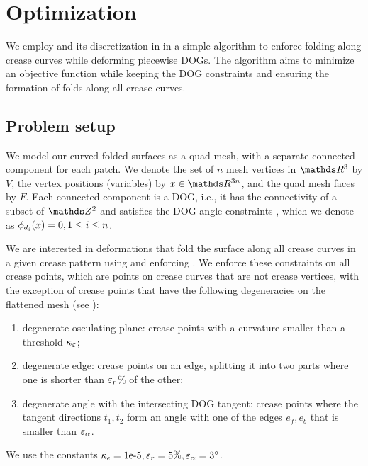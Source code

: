 
\section{Optimization} \label{sec:implementation}
We employ  and its discretization in  in a simple algorithm to enforce folding along crease curves while deforming piecewise DOGs. The algorithm aims to minimize an objective function while keeping the DOG constraints and ensuring the formation of folds along all crease curves.

\subsection{Problem setup}
We model our curved folded surfaces as a quad mesh, with a separate connected component for each patch. We denote the set of $n$ mesh vertices in $\R^3$ by $V$, the vertex positions (variables) by $\x \in \R^{3n}$, and the quad mesh faces by $F$. Each connected component is a DOG, i.e., it has the connectivity of a subset of $\Z^2$ and satisfies the DOG angle constraints \cite{rabi18}, which we denote as $\phi_{d_i}(x) = 0, 1 \leq i \leq n$.

We are interested in deformations that fold the surface along all crease curves in a given crease pattern using  and enforcing . We enforce these constraints on all crease points, which are points on crease curves that are not crease vertices, with the exception of crease points that have the following degeneracies on the flattened mesh (see ):
\begin{enumerate}
	\item degenerate osculating plane: crease points with a curvature smaller than a threshold $\kappa_\varepsilon$; \label{item:deg_osc}
	\item degenerate edge: crease points on an edge, splitting it into two parts where one is shorter than $\varepsilon_{r}$\% of the other; \label{item:deg_edge}
	\item degenerate angle with the intersecting DOG tangent: crease points where the tangent directions $t_1,t_2$ form an angle with one of the edges $e_f,e_b$ that is smaller than $\varepsilon_\alpha$. \label{item:deg_tan_angle}
\end{enumerate}
We use the constants $\kappa_\epsilon=\text{1e-5}, \varepsilon_r=5\%, \varepsilon_\alpha=3^{\circ}$.

